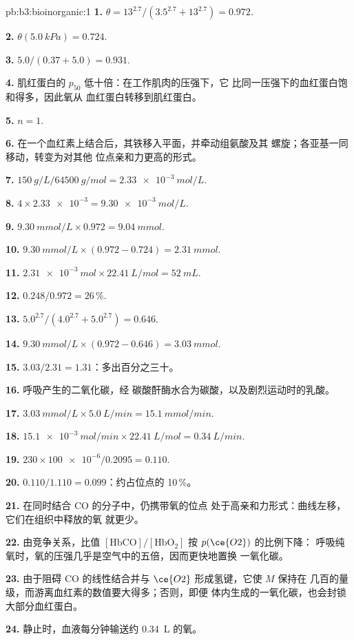 \begin{solution}{pb:b3:bioinorganic:1}
\textbf{1.} $\theta = 13^{2.7}/(3.5^{2.7} + 13^{2.7}) = 0.972$.

\textbf{2.} $\theta(\qty{5.0}{kPa}) = 0.724$.

\textbf{3.} $5.0/(0.37 + 5.0) = 0.931$.

\textbf{4.} 肌红蛋白的 $p_{50}$ 低十倍：在工作肌肉的压强下，它
比同一压强下的血红蛋白饱和得多，因此氧从
血红蛋白转移到肌红蛋白。

\textbf{5.} $n = 1$.

\textbf{6.} 在一个血红素上结合后，其铁移入平面，并牵动组氨酸及其
螺旋；各亚基一同移动，转变为对其他
位点亲和力更高的形式。

\textbf{7.} $\qty{150}{g/L}/\qty{64500}{g/mol} = \qty{2.33e-3}{mol/L}$.

\textbf{8.} $4 \times \num{2.33e-3} = \qty{9.30e-3}{mol/L}$.

\textbf{9.} $\qty{9.30}{mmol/L} \times 0.972 = \qty{9.04}{mmol}$.

\textbf{10.} $\qty{9.30}{mmol/L} \times (0.972 - 0.724) = \qty{2.31}{mmol}$.

\textbf{11.} $\qty{2.31e-3}{mol} \times \qty{22.41}{L/mol} = \qty{52}{mL}$.

\textbf{12.} $0.248/0.972 = 26$\,\%.

\textbf{13.} $5.0^{2.7}/(4.0^{2.7} + 5.0^{2.7}) = 0.646$.

\textbf{14.} $\qty{9.30}{mmol/L} \times (0.972 - 0.646) = \qty{3.03}{mmol}$.

\textbf{15.} $3.03/2.31 = 1.31$：多出百分之三十。

\textbf{16.} 呼吸产生的二氧化碳，经
碳酸酐酶水合为碳酸，以及剧烈运动时的乳酸。

\textbf{17.} $\qty{3.03}{mmol/L} \times \qty{5.0}{L/min} = \qty{15.1}{mmol/min}$.

\textbf{18.} $\qty{15.1e-3}{mol/min} \times \qty{22.41}{L/mol} = \qty{0.34}{L/min}$.

\textbf{19.} $230 \times \num{100e-6}/0.2095 = 0.110$.

\textbf{20.} $0.110/1.110 = 0.099$：约占位点的 10\,\%。

\textbf{21.} 在同时结合 CO 的分子中，仍携带氧的位点
处于高亲和力形式：曲线左移，它们在组织中释放的氧
就更少。

\textbf{22.} 由竞争关系，比值 $[\mathrm{HbCO}]/[\mathrm{HbO_2}]$ 按 $p(\ce{O2})$ 的比例下降：
呼吸纯氧时，氧的压强几乎是空气中的五倍，因而更快地置换
一氧化碳。

\textbf{23.} 由于阻碍 CO 的线性结合并与 $\ce{O2}$ 形成氢键，它使 $M$ 保持在
几百的量级，而游离血红素的数值要大得多；否则，即便
体内生成的一氧化碳，也会封锁大部分血红蛋白。

\textbf{24.} 静止时，血液每分钟输送约 \qty{0.34}{L} 的氧。
\end{solution}

